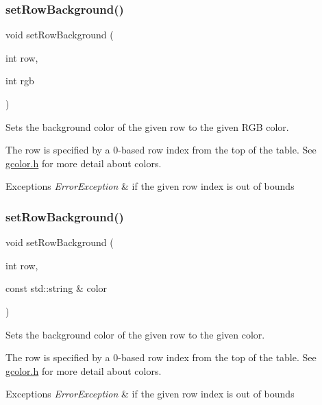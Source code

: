 \subsubsection{\texorpdfstring{set\+Row\+Background()}{setRowBackground()}\hspace{0.1cm}{\footnotesize\ttfamily [1/2]}}
{\footnotesize\ttfamily void set\+Row\+Background (\begin{DoxyParamCaption}\item[{int}]{row,  }\item[{int}]{rgb }\end{DoxyParamCaption})\hspace{0.3cm}{\ttfamily [virtual]}}



Sets the background color of the given row to the given R\+GB color. 

The row is specified by a 0-\/based row index from the top of the table. See \mbox{\hyperlink{gcolor_8h_source}{gcolor.\+h}} for more detail about colors. 
\begin{DoxyExceptions}{Exceptions}
{\em Error\+Exception} & if the given row index is out of bounds \\
\hline
\end{DoxyExceptions}
\mbox{\label{classsgl_1_1GTable_a30c7073dfeac833056ed65a8bb9a7e08}} 
\subsubsection{\texorpdfstring{set\+Row\+Background()}{setRowBackground()}\hspace{0.1cm}{\footnotesize\ttfamily [2/2]}}
{\footnotesize\ttfamily void set\+Row\+Background (\begin{DoxyParamCaption}\item[{int}]{row,  }\item[{const std\+::string \&}]{color }\end{DoxyParamCaption})\hspace{0.3cm}{\ttfamily [virtual]}}



Sets the background color of the given row to the given color. 

The row is specified by a 0-\/based row index from the top of the table. See \mbox{\hyperlink{gcolor_8h_source}{gcolor.\+h}} for more detail about colors. 
\begin{DoxyExceptions}{Exceptions}
{\em Error\+Exception} & if the given row index is out of bounds \\
\hline
\end{DoxyExceptions}
\mbox{\label{classsgl_1_1GTable_a0d4a1d2a58daff8c1984e31b21f93ea1}} 
